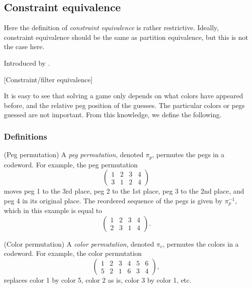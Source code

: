 \subsection{Constraint equivalence}

Here the definition of \emph{constraint equivalence} is rather restrictive. Ideally, constraint equivalence should be the same as partition equivalence, but this is not the case here.

Introduced by \cite{neuwirth81,koyama93}. 

[Constraint/filter equivalence]

It is easy to see that solving a game only depends on what colors have appeared before, and the relative peg position of the guesses. The particular colors or pegs guessed are not important. From this knowledge, we define the following.

\subsubsection{Definitions}

\begin{definition}
(Peg permutation) A \emph{peg permutation}, denoted $\pi_p$, permutes the pegs in a codeword. For example, the peg permutation
\[
\begin{pmatrix}
1 & 2 & 3 & 4 \\
3 & 1 & 2 & 4
\end{pmatrix} 
\]
moves peg 1 to the 3rd place, peg 2 to the 1st place, peg 3 to the 2nd place, and peg 4 in its original place. The reordered sequence of the pegs is given by $\pi_p^{-1}$, which in this example is equal to
\[
\begin{pmatrix}
1 & 2 & 3 & 4 \\
2 & 3 & 1 & 4
\end{pmatrix} .
\]
\end{definition}

\begin{definition}
(Color permutation) A \emph{color permutation}, denoted $\pi_c$, permutes the colors in a codeword. For example, the color permutation
\[
\begin{pmatrix}
1 & 2 & 3 & 4 & 5 & 6 \\
5 & 2 & 1 & 6 & 3 & 4
\end{pmatrix} ,
\]
replaces color 1 by color 5, color 2 as is, color 3 by color 1, etc.
\end{definition}

